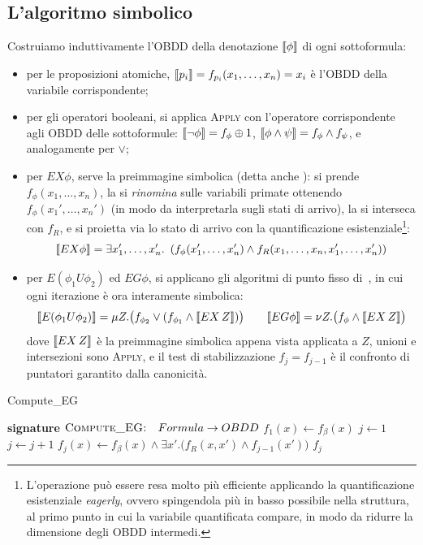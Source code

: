 \subsection{L'algoritmo simbolico}
Costruiamo induttivamente l'OBDD della denotazione \(\den{\phi}\) di ogni sottoformula:
\begin{itemize}
  \item per le proposizioni atomiche, \(\den{p_i}=f_{p_i}(x_1,\ldots,x_n)=x_i\) è l'OBDD della variabile corrispondente;
  \item per gli operatori booleani, si applica \textsc{Apply} con l'operatore corrispondente agli OBDD delle sottoformule: \(\den{\neg\phi}=f_{\phi}\oplus 1\), \(\den{\phi\land\psi}=f_{\phi}\land f_{\psi}\), e analogamente per \(\lor\);
  \item per \(EX\phi\), serve la preimmagine simbolica (detta anche ): si prende \(f_{\phi}(x_1,\ldots,x_n)\), la si \emph{rinomina} sulle variabili primate ottenendo \(f_{\phi}(x_1', \ldots, x_n')\) (in modo da interpretarla sugli stati di arrivo), la si interseca con \(f_{R}\), e si proietta via lo stato di arrivo con la quantificazione esistenziale\footnote{L'operazione può essere resa molto più efficiente applicando la quantificazione esistenziale \emph{eagerly}, ovvero spingendola più in basso possibile nella struttura, al primo punto in cui la variabile quantificata compare, in modo da ridurre la dimensione degli OBDD intermedi.}:
  \[\den{EX\phi}= \exists x_1',\ldots,x_n'.\ \left(f_{\phi}(x_1',\ldots,x_n')\land f_{R}(x_1,\ldots,x_n,x_1',\ldots,x_n')\right)\]
  \item per \(E(\phi_1 U \phi_2)\) ed \(EG\phi\), si applicano gli algoritmi di punto fisso di~, in cui ogni iterazione è ora interamente simbolica:
        \[\den{E(\phi_1U\phi_2)} = \mu Z.\big(f_{\phi_2} \lor (f_{\phi_1}\land\den{EX\,Z})\big) \qquad \den{EG\phi} = \nu Z.\big(f_{\phi}\land\den{EX\,Z}\big)\]
        dove \(\den{EX\,Z}\) è la preimmagine simbolica appena vista applicata a \(Z\), unioni e intersezioni sono \textsc{Apply}, e il test di stabilizzazione \(f_j = f_{j-1}\) è il confronto di puntatori garantito dalla canonicità.
\end{itemize}

\begin{algorithmdesc}{Compute\_EG}
  \begin{algorithmic}[1]
    \Statex{} \textbf{signature} \(\textsc{Compute\_EG:} \quad Formula \to OBDD\)
    \State{} \(f_1(x) \gets f_\beta(x)\)
    \State{} \(j \gets 1\)
    \Repeat{}
    \State{} \(j \gets j+1\)
    \State{} \(f_j(x) \gets f_\beta(x) \land \exists x'.\big(f_R(x,x') \land f_{j-1}(x')\big)\)
    \State{} \Return{} \(f_j\)
    \EndFunction{}
  \end{algorithmic}
\end{algorithmdesc}

